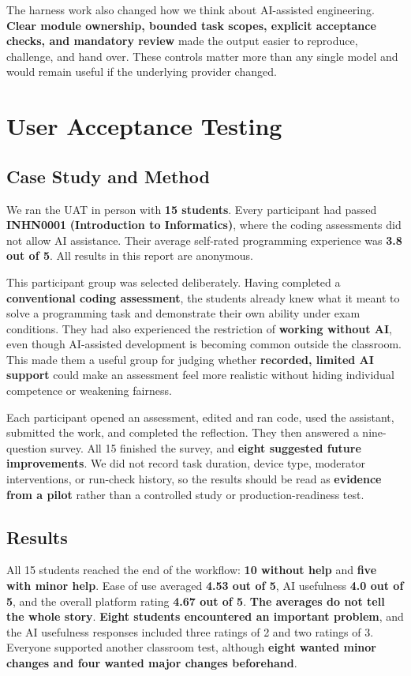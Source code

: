 \documentclass[11pt,a4paper]{article}
\begin{document}
The harness work also changed how we think about AI-assisted engineering. \textbf{Clear module ownership, bounded task scopes, explicit acceptance checks, and mandatory review} made the output easier to reproduce, challenge, and hand over. These controls matter more than any single model and would remain useful if the underlying provider changed.

\clearpage
\section{User Acceptance Testing}

\subsection{Case Study and Method}

We ran the UAT in person with \textbf{15 students}. Every participant had passed \textbf{INHN0001} \textbf{(Introduction to Informatics)}, where the coding assessments did not allow AI assistance. Their average self-rated programming experience was \textbf{3.8 out of 5}. All results in this report are anonymous.

This participant group was selected deliberately. Having completed a \textbf{conventional coding assessment}, the students already knew what it meant to solve a programming task and demonstrate their own ability under exam conditions. They had also experienced the restriction of \textbf{working without AI}, even though AI-assisted development is becoming common outside the classroom. This made them a useful group for judging whether \textbf{recorded, limited AI support} could make an assessment feel more realistic without hiding individual competence or weakening fairness.

Each participant opened an assessment, edited and ran code, used the assistant, submitted the work, and completed the reflection. They then answered a nine-question survey. All 15 finished the survey, and \textbf{eight suggested future improvements}. We did not record task duration, device type, moderator interventions, or run-check history, so the results should be read as \textbf{evidence from a pilot} rather than a controlled study or production-readiness test.

\subsection{Results}

All 15 students reached the end of the workflow: \textbf{10 without help} and \textbf{five with minor help}. Ease of use averaged \textbf{4.53 out of 5}, AI usefulness \textbf{4.0 out of 5}, and the overall platform rating \textbf{4.67 out of 5}. \textbf{The averages do not tell the whole story}. \textbf{Eight students encountered an important problem}, and the AI usefulness responses included three ratings of 2 and two ratings of 3. Everyone supported another classroom test, although \textbf{eight wanted minor changes and four wanted major changes beforehand}.
\end{document}
